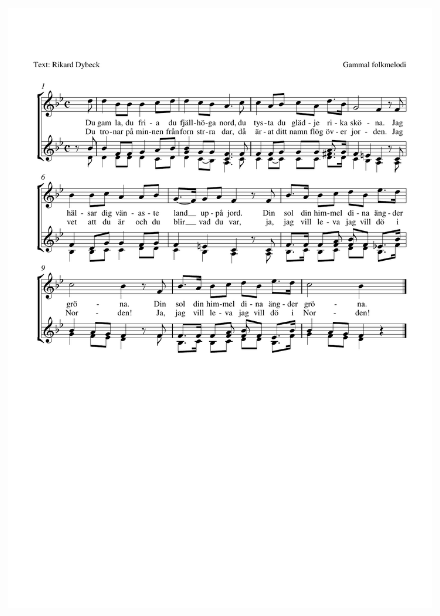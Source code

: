 \documentclass[a6paper,11pt]{article}
\begin{document}
\vspace{-20pt}
\begin{center}
\end{center}
\vspace{-40pt}
\begin{figure}[!h]
\hspace{-10pt}
\includegraphics[width=\textwidth]{du_gamla_du_fria}
\end{figure}
\end{document}
